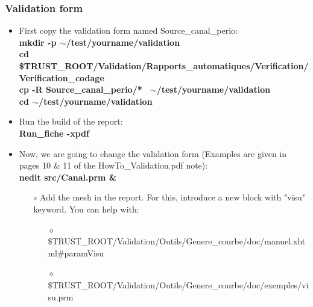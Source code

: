 \documentclass[10pt]{beamer}
\begin{document}
\begin{frame}
\frametitle{Validation form}
\begin{block}{}

\begin{itemize}
\item First copy the validation form named Source\_canal\_perio:\\
{\footnotesize{
\textbf{mkdir -p $\sim$/test/yourname/validation} \\
\textbf{cd \$TRUST\_ROOT/Validation/Rapports\_automatiques/Verification/Verification\_codage } \\
\textbf{cp -R Source\_canal\_perio/* \, $\sim$/test/yourname/validation} \\
\textbf{cd $\sim$/test/yourname/validation} }}\\

\item Run the build of the report:\\
{\footnotesize{\textbf{Run\_fiche -xpdf} }}\\

\item Now, we are going to change the validation form (Examples are given in pages 10 \& 11 of the HowTo\_Validation.pdf note):\\
{\footnotesize{\textbf{nedit src/Canal.prm \&} }} \\

    \begin{itemize}
    \item [$\circ$] Add the mesh in the report. For this, introduce a new block with "visu" keyword. You can help with:
        \begin{itemize}
        \item [$\diamond$] {\scriptsize{\$TRUST\_ROOT/Validation/Outils/Genere\_courbe/doc/manuel.xhtml\#paramVisu}}
        \item [$\diamond$] {\scriptsize{\$TRUST\_ROOT/Validation/Outils/Genere\_courbe/doc/exemples/visu.prm}}
        \end{itemize}
    \end{itemize}

\end{itemize}

\end{block}
\end{frame}
\end{document}

